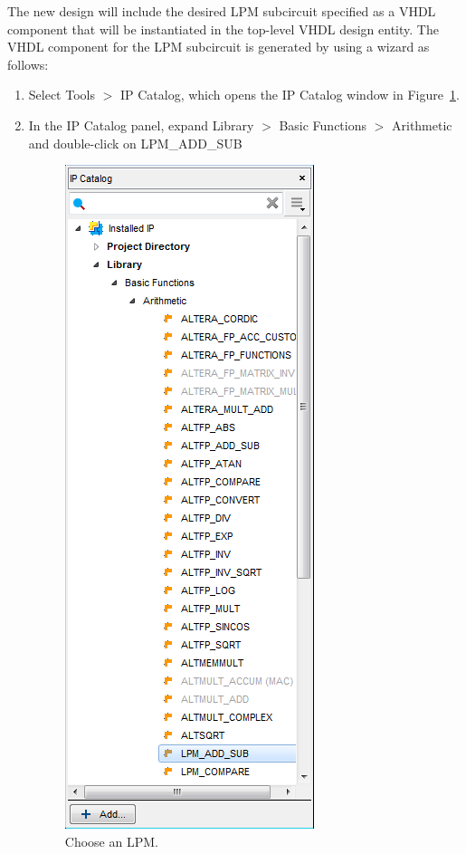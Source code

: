 \documentclass[11pt, twoside, pdftex]{article}
\begin{document}
The new design will include the desired LPM subcircuit specified as a VHDL
component that will be instantiated in the top-level VHDL design entity.
The VHDL component for the LPM subcircuit is generated by using a wizard as
follows:
\begin{enumerate}
\item Select {\sf Tools $>$ IP Catalog}, which
opens the IP Catalog window in Figure~\ref{fig:4}.
\item In the IP Catalog panel, expand {\sf Library $>$ Basic Functions $>$ Arithmetic} and double-click on {\sf LPM\_ADD\_SUB }


\begin{figure}[H]
   \begin{center}
      \includegraphics[scale=0.65]{figures/figure4.png}
   \caption{Choose an LPM.} 
	 \label{fig:4}
	 \end{center}
\end{figure} 
 

\end{enumerate}
\end{document}
